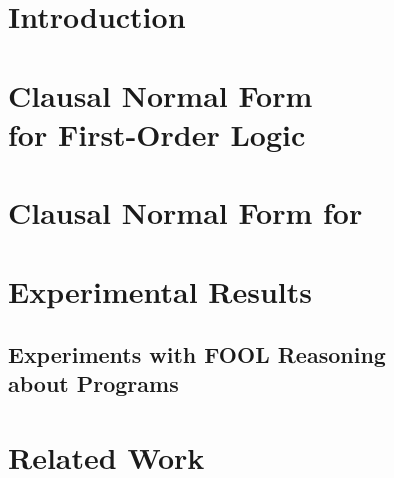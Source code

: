 



\section{Introduction}
\label{sec:newcnf/introduction}


\section[Clausal Normal Form for First-Order Logic]{Clausal Normal Form\\for First-Order Logic}
\label{sec:newcnf/cnf}


\section{Clausal Normal Form for \folb}
\label{sec:newcnf/fool}


\section{Experimental Results}
\label{sec:newcnf/experiments}


\subsection[Experiments with FOOL Reasoning about Programs]{Experiments with FOOL Reasoning\\about Programs}
\label{subsec:PrgAn}


\section{Related Work}
\label{sec:related}


